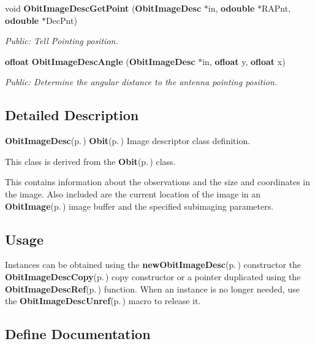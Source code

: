\begin{CompactItemize}
void {\bf Obit\-Image\-Desc\-Get\-Point} ({\bf Obit\-Image\-Desc} $\ast$in, {\bf odouble} $\ast$RAPnt, {\bf odouble} $\ast$Dec\-Pnt)
\begin{CompactList}\small\item\em Public: Tell Pointing position. \item\end{CompactList}\item 
{\bf ofloat} {\bf Obit\-Image\-Desc\-Angle} ({\bf Obit\-Image\-Desc} $\ast$in, {\bf ofloat} y, {\bf ofloat} x)
\begin{CompactList}\small\item\em Public: Determine the angular distance to the antenna pointing position. \item\end{CompactList}\end{CompactItemize}


\subsection{Detailed Description}
{\bf Obit\-Image\-Desc}{\rm (p.\,\pageref{structObitImageDesc})} {\bf Obit}{\rm (p.\,\pageref{structObit})} Image descriptor class definition. 

This class is derived from the {\bf Obit}{\rm (p.\,\pageref{structObit})} class.

This contains information about the observations and the size and coordinates in the image. Also included are the current location of the image in an {\bf Obit\-Image}{\rm (p.\,\pageref{structObitImage})} image buffer and the specified subimaging parameters.\subsection{Usage}\label{ObitImageDesc_8h_ObitImageDescUsage}
Instances can be obtained using the {\bf new\-Obit\-Image\-Desc}{\rm (p.\,\pageref{ObitImageDesc_8c_a6})} constructor the {\bf Obit\-Image\-Desc\-Copy}{\rm (p.\,\pageref{ObitImageDesc_8c_a8})} copy constructor or a pointer duplicated using the {\bf Obit\-Image\-Desc\-Ref}{\rm (p.\,\pageref{ObitImageDesc_8h_a1})} function. When an instance is no longer needed, use the {\bf Obit\-Image\-Desc\-Unref}{\rm (p.\,\pageref{ObitImageDesc_8h_a0})} macro to release it.

\subsection{Define Documentation}
